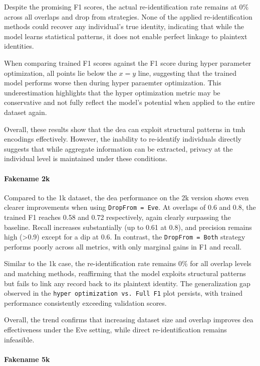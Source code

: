 Despite the promising F1 scores, the actual re-identification rate remains at 0\% across all overlaps and drop from strategies.
None of the applied re-identification methods could recover any individual's true identity, indicating that while the model learns statistical patterns, it does not enable perfect linkage to plaintext identities.

When comparing trained F1 scores against the F1 score during hyper parameter optimization, all points lie below the $x = y$ line, suggesting that the trained model performs worse then during hyper paraemter optimization.
This underestimation highlights that the hyper optimization metric may be conservative and not fully reflect the model’s potential when applied to the entire dataset again.

Overall, these results show that the \ac{dea} can exploit structural patterns in \ac{tmh} encodings effectively.
However, the inability to re-identify individuals directly suggests that while aggregate information can be extracted, privacy at the individual level is maintained under these conditions.

\paragraph{Fakename 2k}

Compared to the 1k dataset, the \ac{dea} performance on the 2k version shows even clearer improvements when using \texttt{DropFrom = Eve}.
At overlaps of 0.6 and 0.8, the trained F1 reaches 0.58 and 0.72 respectively, again clearly surpassing the baseline.
Recall increases substantially (up to 0.61 at 0.8), and precision remains high (>0.9) except for a dip at 0.6.
In contrast, the \texttt{DropFrom = Both} strategy performs poorly across all metrics, with only marginal gains in F1 and recall.

Similar to the 1k case, the re-identification rate remains 0\% for all overlap levels and matching methods, reaffirming that the model exploits structural patterns but fails to link any record back to its plaintext identity.
The generalization gap observed in the \texttt{hyper optimization vs. Full F1} plot persists, with trained performance consistently exceeding validation scores.

Overall, the trend confirms that increasing dataset size and overlap improves \ac{dea} effectiveness under the Eve setting, while direct re-identification remains infeasible.

\paragraph{Fakename 5k}

